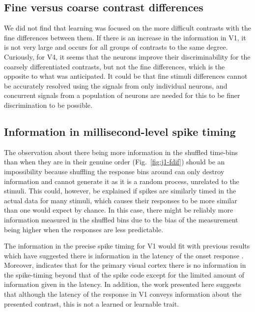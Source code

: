\subsection{Fine versus coarse contrast differences}

We did not find that learning was focused on the more difficult contrasts with the fine differences between them.
If there is an increase in the information in \ac{V1}, it is not very large and occurs for all groups of contrasts to the same degree.
Curiously, for \ac{V4}, it seems that the neurons improve their discriminability for the coarsely differentiated contrasts, but not the fine differences, which is the opposite to what was anticipated.
It could be that fine stimuli differences cannot be accurately resolved using the signals from only individual neurons, and concurrent signals from a population of neurons are needed for this to be finer discrimination to be possible.

\subsection{Information in millisecond-level spike timing}

The observation about there being more information in the shuffled time-bins than when they are in their genuine order (Fig.~\ref{fig:j1-fdif}) should be an impossibility because shuffling the response bins around can only destroy information and cannot generate it as it is a random process, unrelated to the stimuli.
This could, however, be explained if spikes are similarly timed in the actual data for many stimuli, which causes their responses to be more similar than one would expect by chance.
In this case, there might be reliably more information measured in the shuffled bins due to the bias of the measurement being higher when the responses are less predictable.

The information in the precise spike timing for \ac{V1} would fit with previous results which have suggested there is information in the latency of the onset response
\cite{Reich2001,Tovee1993,Rolls2011}.
Moreover, \cite{Tovee1993,Rolls2011} indicates that for the primary visual cortex there is no information in the spike-timing beyond that of the spike code except for the limited amount of information given in the latency.
In addition, the work presented here suggests that although the latency of the response in \ac{V1} conveys information about the presented contrast, this is not a learned or learnable trait.


